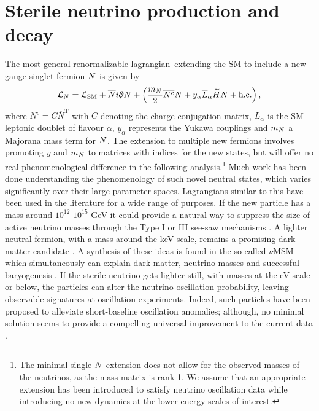 \documentclass[11pt, a4paper]{article}
\def\lagrangian{lagrangian}
\def\ster{\ensuremath N}
\begin{document}
\section{\label{sec:decays}Sterile neutrino production and decay}

The most general renormalizable \lagrangian\ extending the SM to include a new
gauge-singlet fermion $\ster$ is given by
%
\begin{align}   \mathcal{L}_N = \mathcal{L}_\text{SM} +
\overline{\ster}i\slashed{\partial}\ster + \left(\frac{m_\ster}{2}
\overline{\ster^\text{c}}\ster  + y_\alpha\overline{L}_\alpha\widetilde{H}
\ster + \text{h.c.}\right),\label{eq:minimallag} \end{align}
%
where $N^c=C\overline{N}^\text{T}$ with $C$ denoting the charge-conjugation
matrix, $L_\alpha$ is the SM leptonic doublet of flavour $\alpha$, $y_\alpha$
represents the Yukawa couplings and $m_\ster$ a Majorana mass term for $\ster$.
The extension to multiple new fermions involves promoting $y$ and $m_\ster$ to
matrices with indices for the new states, but will offer no real
phenomenological difference in the following analysis.\footnote{The minimal single
$\ster$ extension does not allow for the observed masses of the neutrinos, as
the mass matrix is rank 1. We assume that an appropriate extension has been
introduced to satisfy neutrino oscillation data while introducing no new
dynamics at the lower energy scales of interest.} Much work has been done
understanding the phenomenology of such novel neutral states, which varies
significantly over their large parameter spaces. 
%
Lagrangians similar to this have been used in the literature for a wide range
of purposes. If the new particle has a mass around $10^{12}$-$10^{15}$ GeV it
could provide a natural way to suppress the size of active neutrino masses
through the Type I or III see-saw mechanisms \cite{Minkowski:1977sc,
GellMann:1980vs, Mohapatra:1979ia}. A lighter neutral fermion, with a mass
around the keV scale, remains a promising dark matter candidate
\cite{Adhikari:2016bei}. A synthesis of these ideas is found in the so-called
$\nu$MSM which simultaneously can explain dark matter, neutrino masses and
successful baryogenesis \cite{Asaka:2005pn}. 
%
If the sterile neutrino gets lighter still, with masses at the eV scale or
below, the particles can alter the neutrino oscillation probability, leaving
observable signatures at oscillation experiments. Indeed, such particles have
been proposed to alleviate short-baseline oscillation anomalies; although, no
minimal solution seems to provide a compelling universal improvement to the
current data \cite{Kopp:2013vaa,Conrad:2012qt}.
\end{document}
